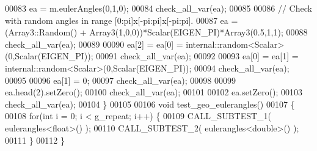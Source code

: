 \begin{DoxyCode}
00083   ea = m.eulerAngles(0,1,0);
00084   check\_all\_var(ea);
00085   
00086   \textcolor{comment}{// Check with random angles in range [0:pi]x[-pi:pi]x[-pi:pi].}
00087   ea = (Array3::Random() + Array3(1,0,0))*Scalar(EIGEN\_PI)*Array3(0.5,1,1);
00088   check\_all\_var(ea);
00089   
00090   ea[2] = ea[0] = internal::random<Scalar>(0,Scalar(EIGEN\_PI));
00091   check\_all\_var(ea);
00092   
00093   ea[0] = ea[1] = internal::random<Scalar>(0,Scalar(EIGEN\_PI));
00094   check\_all\_var(ea);
00095   
00096   ea[1] = 0;
00097   check\_all\_var(ea);
00098   
00099   ea.head(2).setZero();
00100   check\_all\_var(ea);
00101   
00102   ea.setZero();
00103   check\_all\_var(ea);
00104 \}
00105 
00106 \textcolor{keywordtype}{void} test\_geo\_eulerangles()
00107 \{
00108   \textcolor{keywordflow}{for}(\textcolor{keywordtype}{int} i = 0; i < g\_repeat; i++) \{
00109     CALL\_SUBTEST\_1( eulerangles<float>() );
00110     CALL\_SUBTEST\_2( eulerangles<double>() );
00111   \}
00112 \}
\end{DoxyCode}
